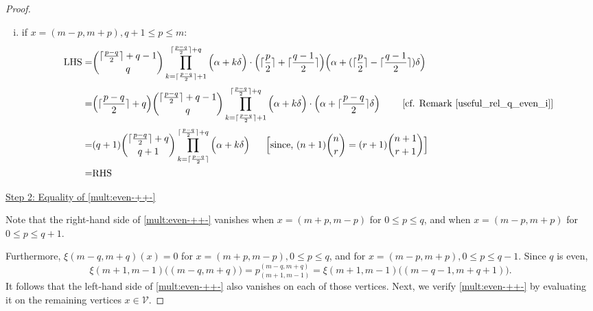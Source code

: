 \documentclass[10pt, a4paper, reqno]{amsart}
\begin{document}
\begin{proof}
\begin{enumerate}[(i)]
		
		\item if $x=(m-p,m+p), q+1\leq p\leq m$:	
		\[\begin{split}
			\text{LHS}=& 		\displaystyle	\binom{\lceil \frac{p-q}{2} \rceil + q-1}{\,q\,}\prod_{k=\lceil \frac{p-q}{2} \rceil +1}^{\lceil \frac{p-q}{2} \rceil +q}\Big(\alpha +k\delta\Big)  \cdot  \Big(\lceil \frac{p}{2}\rceil+\lceil \frac{q-1}{2}\rceil\Big)\Big(\alpha+(\lceil \frac{p}{2}\rceil- \lceil \frac{q-1}{2}\rceil)\delta\Big)\\
			=&	\displaystyle\Big( \lceil\frac{p-q}{2}\rceil+q\Big)	\binom{\lceil \frac{p-q}{2} \rceil + q-1}{\,q\,}\prod_{k=\lceil \frac{p-q}{2} \rceil +1}^{\lceil \frac{p-q}{2} \rceil +q}\Big(\alpha +k\delta\Big)  \cdot  \Big(\alpha+\lceil \frac{p-q}{2}\rceil\delta\Big) \text{ ~~~~~~[cf. Remark \ref{useful_rel_q_even_i}]}  \\
			=&(q+1)	\displaystyle\binom{\lceil \frac{p-q}{2} \rceil+ q}{\,q+1\,}\prod_{k=\lceil \frac{p-q}{2} \rceil}^{\lceil \frac{p-q}{2} \rceil+q }\Big(\alpha+k\delta \Big)  ~~~~~ \text{\Big [since, $(n+1)\binom{n}{r}=(r+1)\binom{n+1}{r+1}$\Big]}  \\
			= &\text{RHS}
		\end{split}\]			
	\end{enumerate}
	
	\underline{Step 2:	Equality of  \eqref{mult:even-++-}} 
	
	Note that the right-hand side of \eqref{mult:even-++-}  vanishes when $x = (m+p, m-p)$ for $0 \leq p \leq q$, 
	and when $x = (m-p, m+p)$ for $0 \leq p \leq q+1$. 
	
	Furthermore, 	$\xi(m-q,m+q)(x)=0$ for $x = (m+p, m-p), 0 \leq p \leq q$, and  for $x = (m-p, m+p),0 \leq p \leq q-1$. Since $q$ is even,
	\[\xi(m+1, m-1)\big((m-q, m+q)\big)=p^{(m-q, m+q)}_{(m+1, m-1)}	= \xi(m+1, m-1)\big((m-q-1, m+q+1)\big).\]
	It follows that the left-hand side of \eqref{mult:even-++-} also vanishes on each of those vertices. 	Next, we verify \eqref{mult:even-++-} by evaluating it on the remaining vertices $x \in \mathcal{V}$.
	

\end{proof}
\end{document}
